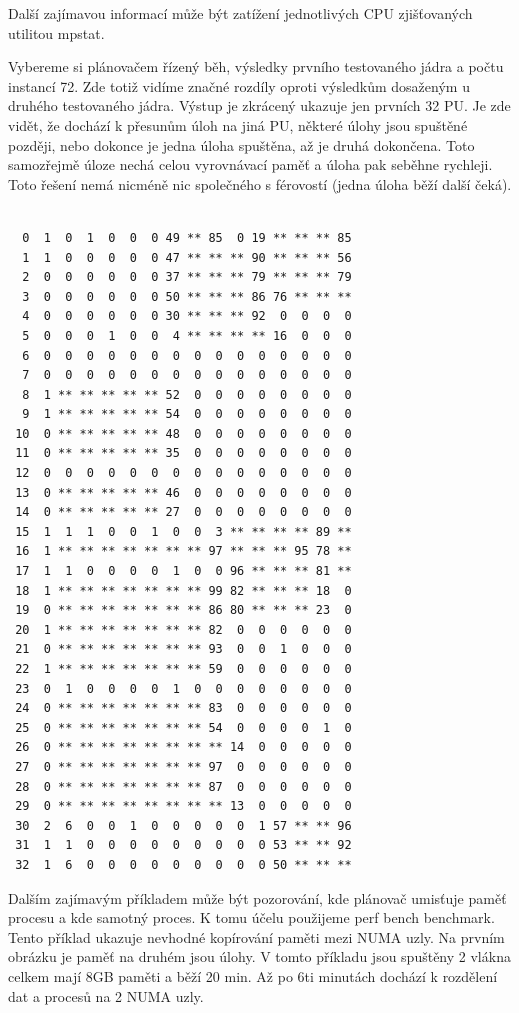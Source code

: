 \documentclass[a4paper,12pt]{article}
\begin{document}
Další zajímavou informací může být zatížení jednotlivých CPU zjišťovaných utilitou mpstat.

Vybereme si plánovačem řízený běh, výsledky prvního testovaného jádra a počtu instancí 72. Zde totiž vidíme značné rozdíly oproti výsledkům dosaženým u druhého testovaného jádra. Výstup je zkrácený ukazuje jen prvních 32 PU. Je zde vidět, že dochází k přesunům úloh na jiná PU, některé úlohy jsou spuštěné později, nebo dokonce je jedna úloha spuštěna, až je druhá dokončena. Toto samozřejmě úloze nechá celou vyrovnávací paměť a úloha pak seběhne rychleji. Toto řešení nemá nicméně nic společného s férovostí (jedna úloha běží další čeká).

\begin{verbatim}

  0  1  0  1  0  0  0 49 ** 85  0 19 ** ** ** 85 
  1  1  0  0  0  0  0 47 ** ** ** 90 ** ** ** 56 
  2  0  0  0  0  0  0 37 ** ** ** 79 ** ** ** 79 
  3  0  0  0  0  0  0 50 ** ** ** 86 76 ** ** ** 
  4  0  0  0  0  0  0 30 ** ** ** 92  0  0  0  0 
  5  0  0  0  1  0  0  4 ** ** ** ** 16  0  0  0 
  6  0  0  0  0  0  0  0  0  0  0  0  0  0  0  0 
  7  0  0  0  0  0  0  0  0  0  0  0  0  0  0  0 
  8  1 ** ** ** ** ** 52  0  0  0  0  0  0  0  0 
  9  1 ** ** ** ** ** 54  0  0  0  0  0  0  0  0 
 10  0 ** ** ** ** ** 48  0  0  0  0  0  0  0  0 
 11  0 ** ** ** ** ** 35  0  0  0  0  0  0  0  0 
 12  0  0  0  0  0  0  0  0  0  0  0  0  0  0  0 
 13  0 ** ** ** ** ** 46  0  0  0  0  0  0  0  0 
 14  0 ** ** ** ** ** 27  0  0  0  0  0  0  0  0 
 15  1  1  1  0  0  1  0  0  3 ** ** ** ** 89 ** 
 16  1 ** ** ** ** ** ** ** 97 ** ** ** 95 78 ** 
 17  1  1  0  0  0  0  1  0  0 96 ** ** ** 81 ** 
 18  1 ** ** ** ** ** ** ** 99 82 ** ** ** 18  0 
 19  0 ** ** ** ** ** ** ** 86 80 ** ** ** 23  0 
 20  1 ** ** ** ** ** ** ** 82  0  0  0  0  0  0 
 21  0 ** ** ** ** ** ** ** 93  0  0  1  0  0  0 
 22  1 ** ** ** ** ** ** ** 59  0  0  0  0  0  0 
 23  0  1  0  0  0  0  1  0  0  0  0  0  0  0  0 
 24  0 ** ** ** ** ** ** ** 83  0  0  0  0  0  0 
 25  0 ** ** ** ** ** ** ** 54  0  0  0  0  1  0 
 26  0 ** ** ** ** ** ** ** ** 14  0  0  0  0  0 
 27  0 ** ** ** ** ** ** ** 97  0  0  0  0  0  0 
 28  0 ** ** ** ** ** ** ** 87  0  0  0  0  0  0 
 29  0 ** ** ** ** ** ** ** ** 13  0  0  0  0  0 
 30  2  6  0  0  1  0  0  0  0  0  1 57 ** ** 96 
 31  1  1  0  0  0  0  0  0  0  0  0 53 ** ** 92 
 32  1  6  0  0  0  0  0  0  0  0  0 50 ** ** ** 

\end{verbatim}

Dalším zajímavým příkladem může být pozorování, kde plánovač umisťuje paměť procesu a kde samotný proces. K tomu účelu použijeme perf bench benchmark.
Tento příklad ukazuje nevhodné kopírování paměti mezi NUMA uzly. Na prvním obrázku je paměť na druhém jsou úlohy. V tomto příkladu jsou spuštěny 2 vlákna celkem mají 8GB paměti a běží 20 min. Až po 6ti minutách dochází k rozdělení dat a procesů na 2 NUMA uzly. 
\end{document}
